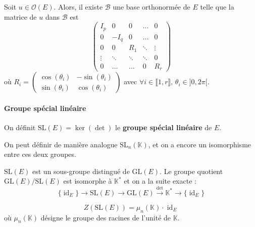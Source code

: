  \begin{theorem}
    Soit $u \in \mathcal{O}(E)$. Alors, il existe $\mathcal{B}$ une base orthonormée de $E$ telle que la matrice de $u$ dans $\mathcal{B}$ est
    \[ \begin{pmatrix} I_p & 0 & 0 & \dots & 0 \\ 0 & -I_q & 0 & \dots & 0 \\ 0 & 0 & R_1 & \ddots & \vdots \\ \vdots & \ddots & \ddots & \ddots & 0 \\ 0 & \dots & \dots & 0 & R_r \end{pmatrix} \]
    où $R_i = \begin{pmatrix} \cos(\theta_i) & -\sin(\theta_i) \\ \sin(\theta_i) & \cos(\theta_i) \end{pmatrix}$ avec $\forall i \in \llbracket 1, r \rrbracket, \, \theta_i \in ]0,2\pi[$.
  \end{theorem}

  \paragraph{Groupe spécial linéaire}


  \begin{definition}
    On définit $\mathrm{SL}(E) = \ker(\det)$ le \textbf{groupe spécial linéaire} de $E$.
  \end{definition}

  \begin{remark}
    On peut définir de manière analogue $\mathrm{SL}_n(\mathbb{K})$, et on a encore un isomorphisme entre ces deux groupes.
  \end{remark}

  \begin{theorem}
    $\mathrm{SL}(E)$ est un sous-groupe distingué de $\mathrm{GL}(E)$. Le groupe quotient $\mathrm{GL}(E)/\mathrm{SL}(E)$ est isomorphe à $\mathbb{K}^*$ et on a la suite exacte :
    \[ \{ \operatorname{id}_E \} \rightarrow \mathrm{SL}(E) \rightarrow \mathrm{GL}(E) \xrightarrow{\det} \mathbb{K}^* \rightarrow \{ \operatorname{id}_E \} \]
  \end{theorem}

  \begin{theorem}
    \[ Z(\mathrm{SL}(E)) = \mu_n(\mathbb{K}) \cdot \operatorname{id}_E \]
    où $\mu_n(\mathbb{K})$ désigne le groupe des racines de l'unité de $\mathbb{K}$.
  \end{theorem}

